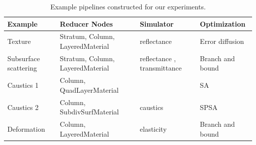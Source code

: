 \documentclass[annual]{acmsiggraph}
\begin{document}
\begin{table}
\centering
\begin{tabular}{llll}  %
\hline 
\textbf{Example} & \textbf{Reducer Nodes} & \textbf{Simulator} & \textbf{Optimization}\\
\hline 
Texture& Stratum, Column, LayeredMaterial & reflectance & Error diffusion \\
Subsurface scattering& Stratum, Column, LayeredMaterial & reflectance , transmittance & Branch and bound\\
Caustics 1 & Column, QuadLayerMaterial & & SA \\
Caustics 2 & Column, SubdivSurfMaterial & caustics & SPSA \\
Deformation & Column, LayeredMaterial& elasticity & Branch and bound\\
\hline
\end{tabular}
\caption{Example pipelines constructed for our experiments.}
\label{tab:example}
\end{table}
\end{document}
